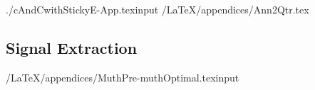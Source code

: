 \documentclass[titlepage]{\econtex}
\newcommand{\texname}{cAndCwithStickyE-App}
\begin{document}
\begin{verbatimwrite}{./cAndCwithStickyE-App.texinput}
\econtexRoot/LaTeX/appendices/Ann2Qtr.tex

\subsection{\cite{muthOptimal} Signal Extraction}\label{appendix:Muth}

\econtexRoot/LaTeX/appendices/MuthPre-muthOptimal.texinput

\end{verbatimwrite}


\small

\normalsize
\end{document}
